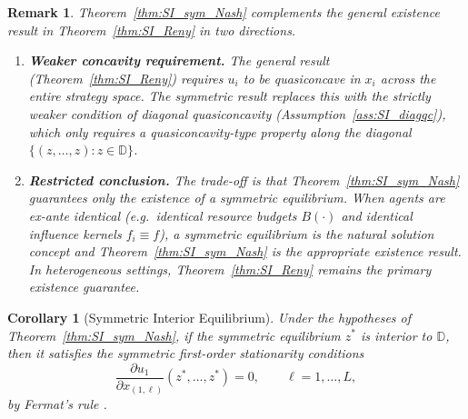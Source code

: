 \documentclass{article}
\newtheorem{corollary}{Corollary}[theorem]
\newtheorem{remark}{Remark}
\begin{document}
    \begin{remark}\label{rem:SI_sym_vs_general}
        Theorem~\ref{thm:SI_sym_Nash} complements the general existence result
        in Theorem~\ref{thm:SI_Reny} in two directions.

        \begin{enumerate}[label=(\roman*)]
            \item \textbf{Weaker concavity requirement.}  The general result
            (Theorem~\ref{thm:SI_Reny}) requires $u_i$ to be quasiconcave in
            $x_i$ across the entire strategy space.  The symmetric result
            replaces this with the strictly weaker condition of diagonal
            quasiconcavity (Assumption~\ref{ass:SI_diagqc}), which only
            requires a quasiconcavity-type property along the diagonal
            $\{(z, \ldots, z) : z \in \mathbb{D}\}$.

            \item \textbf{Restricted conclusion.}  The trade-off is that
            Theorem~\ref{thm:SI_sym_Nash} guarantees only the existence of a
            symmetric equilibrium.  When agents are ex-ante identical
            (e.g.\ identical resource budgets $B(\cdot)$ and identical influence
            kernels $f_i \equiv f$), a symmetric equilibrium is the natural
            solution concept and Theorem~\ref{thm:SI_sym_Nash} is the
            appropriate existence result.  In heterogeneous settings,
            Theorem~\ref{thm:SI_Reny} remains the primary existence guarantee.
        \end{enumerate}
    \end{remark}

    \begin{corollary}[Symmetric Interior Equilibrium]\label{cor:SI_sym_interior}
        Under the hypotheses of Theorem~\ref{thm:SI_sym_Nash}, if the symmetric
        equilibrium $z^{*}$ is interior to $\mathbb{D}$, then it satisfies the
        symmetric first-order stationarity conditions
        \[
            \frac{\partial u_1}{\partial x_{(1,\ell)}}(z^{*}, \ldots, z^{*}) = 0,
            \qquad \ell = 1, \ldots, L,
        \]
        by Fermat's rule \cite[Theorem~27.1]{rockafellar1970convex}.
    \end{corollary}
\end{document}
